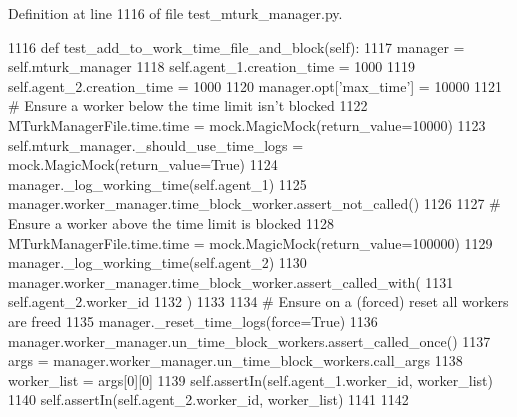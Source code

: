 Definition at line 1116 of file test\+\_\+mturk\+\_\+manager.\+py.


\begin{DoxyCode}
1116     \textcolor{keyword}{def }test\_add\_to\_work\_time\_file\_and\_block(self):
1117         manager = self.mturk\_manager
1118         self.agent\_1.creation\_time = 1000
1119         self.agent\_2.creation\_time = 1000
1120         manager.opt[\textcolor{stringliteral}{'max\_time'}] = 10000
1121         \textcolor{comment}{# Ensure a worker below the time limit isn't blocked}
1122         MTurkManagerFile.time.time = mock.MagicMock(return\_value=10000)
1123         self.mturk\_manager.\_should\_use\_time\_logs = mock.MagicMock(return\_value=\textcolor{keyword}{True})
1124         manager.\_log\_working\_time(self.agent\_1)
1125         manager.worker\_manager.time\_block\_worker.assert\_not\_called()
1126 
1127         \textcolor{comment}{# Ensure a worker above the time limit is blocked}
1128         MTurkManagerFile.time.time = mock.MagicMock(return\_value=100000)
1129         manager.\_log\_working\_time(self.agent\_2)
1130         manager.worker\_manager.time\_block\_worker.assert\_called\_with(
1131             self.agent\_2.worker\_id
1132         )
1133 
1134         \textcolor{comment}{# Ensure on a (forced) reset all workers are freed}
1135         manager.\_reset\_time\_logs(force=\textcolor{keyword}{True})
1136         manager.worker\_manager.un\_time\_block\_workers.assert\_called\_once()
1137         args = manager.worker\_manager.un\_time\_block\_workers.call\_args
1138         worker\_list = args[0][0]
1139         self.assertIn(self.agent\_1.worker\_id, worker\_list)
1140         self.assertIn(self.agent\_2.worker\_id, worker\_list)
1141 
1142 
\end{DoxyCode}
\mbox{\label{classparlai_1_1mturk_1_1core_1_1test_1_1test__mturk__manager_1_1TestMTurkManagerTimeHandling_a754114f385879a400d9ac70855334821}} 
